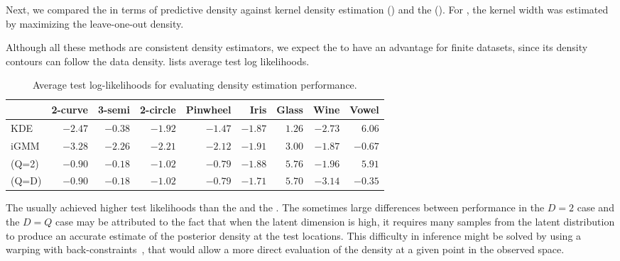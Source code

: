 Next, we compared the \iwmm{} in terms of predictive density against kernel density estimation (\KDE{}) and the (\iGMM{}).
For \KDE{}, the kernel width was estimated by maximizing the leave-one-out density.

Although all these methods are consistent density estimators, we expect the \iwmm{} to have an advantage for finite datasets, since its density contours can follow the data density.
%
 lists average test log likelihoods.
%
\begin{table}[ht!]
\centering
\caption[Predictive likelihood comparison]
{Average test log-likelihoods for evaluating density estimation performance.}
\label{tab:likelihood}
\begin{tabular}{lrrrrrrrr}
\hline
& 2-curve & 3-semi & 2-circle & Pinwheel & Iris  & Glass  & Wine  & Vowel  \\
\hline 
KDE & $-2.47$ & $-0.38$ & $-1.92$ & $-1.47$ & $\mathbf{-1.87}$ & $1.26$ & $-2.73$ & $\mathbf{6.06}$ \\
iGMM & $-3.28$ & $-2.26$ & $-2.21$ & $-2.12$ & $-1.91$ & $3.00$ & $\mathbf{-1.87}$ & $-0.67$ \\
\iwmm{}(Q=2) & $\mathbf{-0.90}$ & $\mathbf{-0.18}$ & $\mathbf{-1.02}$ & $\mathbf{-0.79}$ & $\mathbf{-1.88}$ & $\mathbf{5.76}$ & $\mathbf{-1.96}$ & $\mathbf{5.91}$ \\
\iwmm{}(Q=D) & $\mathbf{-0.90}$ & $\mathbf{-0.18}$ & $\mathbf{-1.02}$ & $\mathbf{-0.79}$ & $\mathbf{-1.71}$ & $\mathbf{5.70}$ & $-3.14$ & $-0.35$ \\
\hline
\end{tabular}
\end{table}


The \iwmm{} usually achieved higher test likelihoods than the \KDE{} and the \iGMM{}.
%
The sometimes large differences between performance in the $D = 2$ case and the $D = Q$ case may be attributed to the fact that when the latent dimension is high, it requires many samples from the latent distribution to produce an accurate estimate of the posterior density at the test locations.
This difficulty in inference might be solved by using a warping with back-constraints~\citep{Lawrence06localdistance}, that would allow a more direct evaluation of the density at a given point in the observed space.




